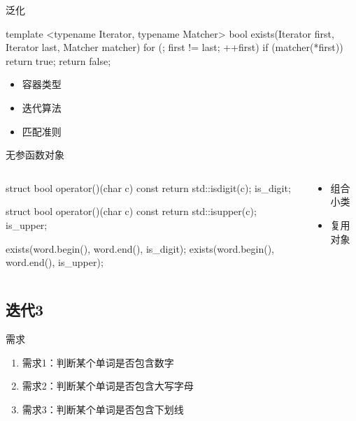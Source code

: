 \begin{frame}[fragile]{泛化}
  \begin{c++}
  template <typename Iterator, typename Matcher>
  bool exists(Iterator first, Iterator last, Matcher matcher) {
    for (; first != last; ++first)
      if (matcher(*first))
        return true;
    return false;
  }
  \end{c++}

  \begin{itemize}
    \item \alert{容器类型}
    \item \alert{迭代算法}
    \item \alert{匹配准则}    
  \end{itemize}
\end{frame}

\begin{frame}[fragile]{无参函数对象}
\begin{columns} 
  \begin{column}{0.7\textwidth}
  \begin{c++}
  struct {
    bool operator()(char c) const {
      return std::isdigit(c); 
    }
  } is_digit;

  struct {
    bool operator()(char c) const {
      return std::isupper(c); 
    }
  } is_upper;

  exists(word.begin(), word.end(), is_digit);
  exists(word.begin(), word.end(), is_upper);
  \end{c++}
  \end{column} 

  \begin{column}{0.3\textwidth}
  \begin{itemize}
    \item \alert{组合小类}
    \item \alert{复用对象}
  \end{itemize}  
  \end{column}
  \end{columns} 
\end{frame}

\subsection{迭代3}

\begin{frame}{需求}
  \begin{block}{}
    \begin{enumerate}
    \item \alert{需求1}：判断某个单词是否包含数字
    \item \alert{需求2}：判断某个单词是否包含大写字母
    \item<alert@1-> 需求3：判断某个单词是否包含下划线 
    \end{enumerate}
  \end{block}
\end{frame}

